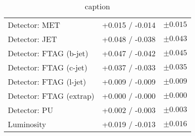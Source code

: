 \begin{table}[h]
\begin{tabular}{lrr}
    \:\:\:\: Detector: MET            & +0.015 / -0.014 & $ \pm 0.015 $ \\
    \:\:\:\: Detector: JET            & +0.048 / -0.038 & $ \pm 0.043 $ \\
    \:\:\:\: Detector: FTAG (b-jet)   & +0.047 / -0.042 & $ \pm 0.045 $ \\
    \:\:\:\: Detector: FTAG (c-jet)   & +0.037 / -0.033 & $ \pm 0.035 $ \\
    \:\:\:\: Detector: FTAG (l-jet)   & +0.009 / -0.009 & $ \pm 0.009 $ \\
    \:\:\:\: Detector: FTAG (extrap)  & +0.000 / -0.000 & $ \pm 0.000 $ \\
    \:\:\:\: Detector: PU             & +0.002 / -0.003 & $ \pm 0.003 $ \\
    \:\:\:\: Luminosity               & +0.019 / -0.013 & $ \pm 0.016 $ \\
    \bottomrule
  \end{tabular}
\caption{caption}
\label{tab:breakdown_012L_MVAVH}
\end{table}